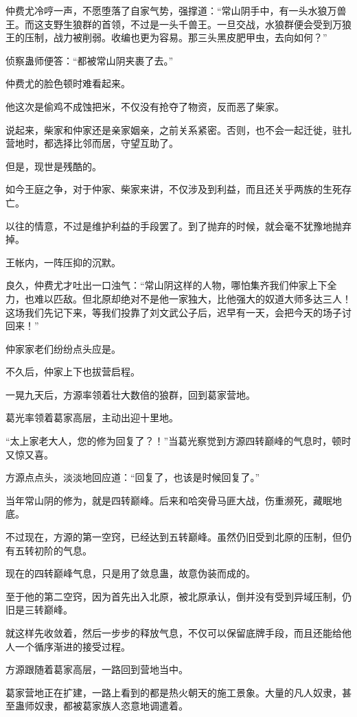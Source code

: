 \begin{this_body}
仲费尤冷哼一声，不愿堕落了自家气势，强撑道：“常山阴手中，有一头水狼万兽王。而这支野生狼群的首领，不过是一头千兽王。一旦交战，水狼群便会受到万狼王的压制，战力被削弱。收编也更为容易。那三头黑皮肥甲虫，去向如何？”

侦察蛊师便答：“都被常山阴夹裹了去。”

仲费尤的脸色顿时难看起来。

他这次是偷鸡不成蚀把米，不仅没有抢夺了物资，反而恶了柴家。

说起来，柴家和仲家还是亲家姻亲，之前关系紧密。否则，也不会一起迁徙，驻扎营地时，都选择比邻而居，守望互助了。

但是，现世是残酷的。

如今王庭之争，对于仲家、柴家来讲，不仅涉及到利益，而且还关乎两族的生死存亡。

以往的情意，不过是维护利益的手段罢了。到了抛弃的时候，就会毫不犹豫地抛弃掉。

王帐内，一阵压抑的沉默。

良久，仲费尤才吐出一口浊气：“常山阴这样的人物，哪怕集齐我们仲家上下全力，也难以匹敌。但北原却绝对不是他一家独大，比他强大的奴道大师多达三人！这场我们先记下来，等我们投靠了刘文武公子后，迟早有一天，会把今天的场子讨回来！”

仲家家老们纷纷点头应是。

不久后，仲家上下也拔营启程。

一晃九天后，方源率领着壮大数倍的狼群，回到葛家营地。

葛光率领着葛家高层，主动出迎十里地。

“太上家老大人，您的修为回复了？！”当葛光察觉到方源四转巅峰的气息时，顿时又惊又喜。

方源点点头，淡淡地回应道：“回复了，也该是时候回复了。”

当年常山阴的修为，就是四转巅峰。后来和哈突骨马匪大战，伤重濒死，藏眠地底。

不过现在，方源的第一空窍，已经达到五转巅峰。虽然仍旧受到北原的压制，但仍有五转初阶的气息。

现在的四转巅峰气息，只是用了敛息蛊，故意伪装而成的。

至于他的第二空窍，因为首先出入北原，被北原承认，倒并没有受到异域压制，仍旧是三转巅峰。

就这样先收敛着，然后一步步的释放气息，不仅可以保留底牌手段，而且还能给他人一个循序渐进的接受过程。

方源跟随着葛家高层，一路回到营地当中。

葛家营地正在扩建，一路上看到的都是热火朝天的施工景象。大量的凡人奴隶，甚至蛊师奴隶，都被葛家族人恣意地调遣着。


\end{this_body}
